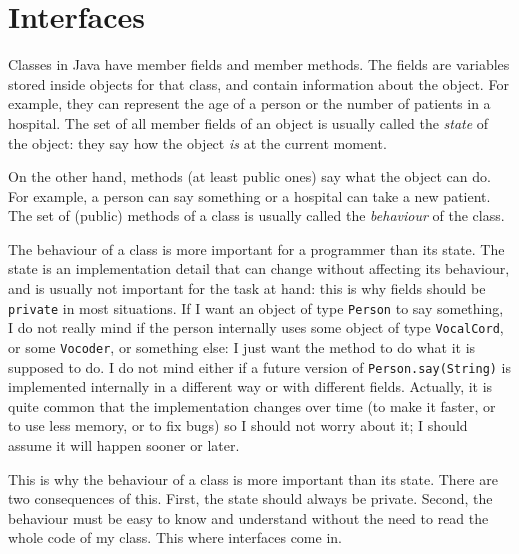%    
% 

\section{Interfaces}
\label{sec:interfaces}

Classes in Java have member fields and member methods. The fields are
variables stored inside objects for that class, and contain
information about the object. For example, they can represent the age
of a person or the number of patients in a hospital. The set of all
member fields of an object is usually called the \emph{state} of the
object: they say how the object \emph{is} at the current moment. 

On the other hand, methods (at least public ones) say what the object
can do. For example, a person can say something or a hospital can take
a new patient. The set of (public) methods of a class is usually
called the \emph{behaviour} of the class. 

The behaviour of a class is more important for a programmer than its
state. The state is an implementation detail that can change without
affecting its behaviour, and is usually not important for the task at
hand: this is why fields should be \verb+private+ in most
situations. If I want an object of type \verb+Person+ to say
something, I do not really mind if the person internally uses some
object of type \verb+VocalCord+, or some \verb+Vocoder+, or something
else: I just want the method to do what it is supposed to do. I do not
mind either if a future version of \verb+Person.say(String)+ is
implemented internally in a different way or with different
fields. Actually, it is quite common that the implementation changes
over time (to make it faster, or to use less memory, or to fix bugs)
so I should not worry about it; I should assume it will happen sooner
or later. 

This is why the behaviour of a class is more important than its
state. There are two consequences of this. First, the state should
always be private. Second, the behaviour must be easy to know and
understand without the need to read the whole code of my class. This
where interfaces come in. 

